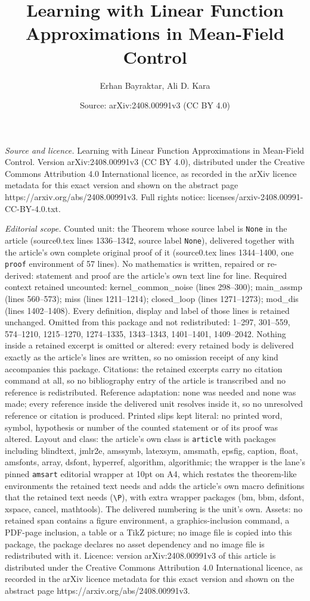 \documentclass[10pt,a4paper]{amsart}
\title[Learning with Linear Function Approximations in Mean-Field C]{Learning with Linear Function Approximations in Mean-Field Control}
\author{Erhan Bayraktar, Ali D. Kara}
\date{Source: arXiv:2408.00991v3 (CC BY 4.0)}
\begin{document}
\maketitle

\noindent\emph{Source and licence.} Learning with Linear Function Approximations in Mean-Field Control. Version arXiv:2408.00991v3 (CC BY 4.0), distributed under the Creative Commons Attribution 4.0 International licence, as recorded in the arXiv licence metadata for this exact version and shown on the abstract page https://arxiv.org/abs/2408.00991v3. Full rights notice: licenses/arxiv-2408.00991-CC-BY-4.0.txt.\par\smallskip

\noindent\textit{Editorial scope.} Counted unit: the Theorem whose source label is \texttt{None} in the article (source0.tex lines 1336--1342, source label \texttt{None}), delivered together with the article's own complete original proof of it (source0.tex lines 1344--1400, one \texttt{proof} environment of 57 lines). No mathematics is written, repaired or re-derived: statement and proof are the article's own text line for line. Required context retained uncounted: kernel\_common\_noise (lines 298--300); main\_assmp (lines 560--573); miss (lines 1211--1214); closed\_loop (lines 1271--1273); mod\_dis (lines 1402--1408). Every definition, display and label of those lines is retained unchanged. Omitted from this package and not redistributed: 1--297, 301--559, 574--1210, 1215--1270, 1274--1335, 1343--1343, 1401--1401, 1409--2042. Nothing inside a retained excerpt is omitted or altered: every retained body is delivered exactly as the article's lines are written, so no omission receipt of any kind accompanies this package. Citations: the retained excerpts carry no citation command at all, so no bibliography entry of the article is transcribed and no reference is redistributed. Reference adaptation: none was needed and none was made; every reference inside the delivered unit resolves inside it, so no unresolved reference or citation is produced. Printed slips kept literal: no printed word, symbol, hypothesis or number of the counted statement or of its proof was altered. Layout and class: the article's own class is \texttt{article} with packages including blindtext, jmlr2e, amssymb, latexsym, amsmath, epsfig, caption, float, amsfonts, array, dsfont, hyperref, algorithm, algorithmic; the wrapper is the lane's pinned \texttt{amsart} editorial wrapper at 10pt on A4, which restates the theorem-like environments the retained text needs and adds the article's own macro definitions that the retained text needs (\texttt{\textbackslash P}), with extra wrapper packages (bm, bbm, dsfont, xspace, cancel, mathtools). The delivered numbering is the unit's own. Assets: no retained span contains a figure environment, a graphics-inclusion command, a PDF-page inclusion, a table or a TikZ picture; no image file is copied into this package, the package declares no asset dependency and no image file is redistributed with it. Licence: version arXiv:2408.00991v3 of this article is distributed under the Creative Commons Attribution 4.0 International licence, as recorded in the arXiv licence metadata for this exact version and shown on the abstract page https://arxiv.org/abs/2408.00991v3. 
\end{document}
